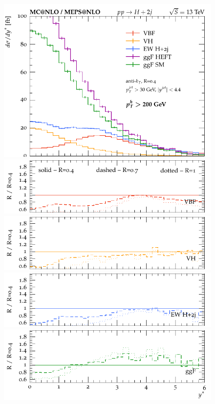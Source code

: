 \documentclass[10pt,prd,fleqn,superscriptaddress,notitlepage,nofootinbib,preprintnumbers,nobalancelastpage]{revtex4-1}
\begin{document}
\begin{figure}[p]
\begin{minipage}{.2925\textwidth}
  \end{minipage}\hfill
  \begin{minipage}{.2925\textwidth}
    \includegraphics[width=\textwidth]{figures/channels/y_star_pth200.pdf}
    \includegraphics[width=\textwidth]{figures/channels/y_star_pth200_rVBF.pdf}
    \includegraphics[width=\textwidth]{figures/channels/y_star_pth200_rVH.pdf}
    \includegraphics[width=\textwidth]{figures/channels/y_star_pth200_rHJJ.pdf}
    \includegraphics[width=\textwidth]{figures/channels/y_star_pth200_rGGH.pdf}

\end{minipage}
\end{figure}
\end{document}

